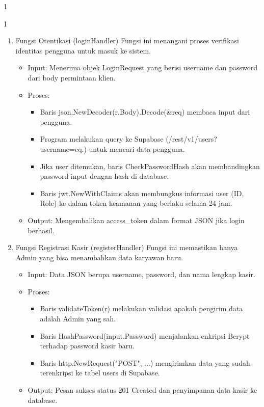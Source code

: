 \begin{enumerate}
\begin{spacing}{1}
\begin{spacing}{1}
\begin{enumerate}[label=\Alph*.]
    \item Fungsi Otentikasi (loginHandler) Fungsi ini menangani proses verifikasi identitas pengguna untuk masuk ke sistem.
    \begin{itemize}
        \item Input: Menerima objek LoginRequest yang berisi username dan password dari body permintaan klien.
        \item Proses:
        \begin{itemize}
            \item Baris json.NewDecoder(r.Body).Decode(&req) membaca input dari pengguna.
            \item Program melakukan query ke Supabase (/rest/v1/users?username=eq.) untuk mencari data pengguna.
            \item Jika user ditemukan, baris CheckPasswordHash akan membandingkan password input dengan hash di database.
            \item Baris jwt.NewWithClaims akan membungkus informasi user (ID, Role) ke dalam token keamanan yang berlaku selama 24 jam.
        \end{itemize}
        \item Output: Mengembalikan access_token dalam format JSON jika login berhasil.
    \end{itemize}


    \item Fungsi Registrasi Kasir (registerHandler) Fungsi ini memastikan hanya Admin yang bisa menambahkan data karyawan baru.
    \begin{itemize}
        \item Input: Data JSON berupa username, password, dan nama lengkap kasir.
        \item Proses:
        \begin{itemize}
            \item Baris validateToken(r) melakukan validasi apakah pengirim data adalah Admin yang sah.
            \item Baris HashPassword(input.Password) menjalankan enkripsi Bcrypt terhadap password kasir baru.
            \item Baris http.NewRequest("POST", ...) mengirimkan data yang sudah terenkripsi ke tabel users di Supabase.
        \end{itemize}
        \item Output: Pesan sukses status 201 Created dan penyimpanan data kasir ke database.
    \end{itemize}



\end{enumerate}
\end{spacing}
\end{spacing}
\end{enumerate}
